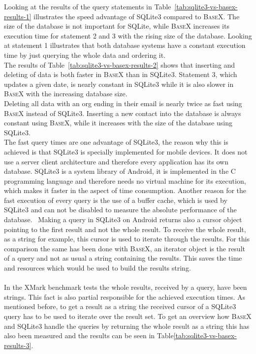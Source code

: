 Looking at the results of the query statements in Table~\ref{tab:sqlite3-vs-basex-results-1} illustrates the speed advantage of SQLite3 compared to \textsc{BaseX}.
The size of the database is not important for SQLite, while \textsc{BaseX} increases its execution time for statement 2 and 3 with the rising size of the database.
Looking at statement 1 illustrates that both database systems have a constant execution time by just querying the whole data and ordering it.\\
The results of Table~\ref{tab:sqlite3-vs-basex-results-2} shows that inserting and deleting of data is both faster in \textsc{BaseX} than in SQLite3.
Statement 3, which updates a given date, is nearly constant in SQLite3 while it is also slower in \textsc{BaseX} with the increasing database size.\\
Deleting all data with an org ending in their email is nearly twice as fast using \textsc{BaseX} instead of SQLite3.
Inserting a new contact into the database is always constant using \textsc{BaseX}, while it increases with the size of the database using SQLite3.\\
The fast query times are one advantage of SQLite3, the reason why this is achieved is that SQLite3 is specially implemented for mobile devices.
It does not use a server client architecture and therefore every application has its own database.\cite{wei2012android}
SQLite3 is a system library of Android, it is implemented in the C programming language and therefore needs no virtual machine for its execution, which makes it faster in the aspect of time consumption.
Another reason for the fast execution of every query is the use of a buffer cache, which is used by SQLite3 and can not be disabled to measure the absolute performance of the database.~\cite{kim2012androbench}
Making a query in SQLite3 on Android returns also a cursor object pointing to the first result and not the whole result. 
To receive the whole result, as a string for example, this cursor is used to iterate through the results.
For this comparison the same has been done with \textsc{BaseX}, an iterator object is the result of a query and not as usual a string containing the results.
This saves the time and resources which would be used to build the results string.\\
\\
In the XMark benchmark tests the whole results, received by a query, have been strings.
This fact is also partial responsible for the achieved execution times.
As mentioned before, to get a result as a string the received cursor of a SQLite3 query has to be used to iterate over the result set.
To get an overview how \textsc{BaseX} and SQLite3 handle the queries by returning the whole result as a string this has also been measured and the results can be seen in Table\ref{tab:sqlite3-vs-basex-results-3}.

